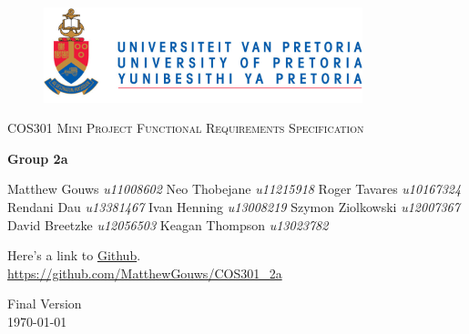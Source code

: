 \begin{titlepage}
	\begin{center}
		
		\begin{figure}[t]
			\centering
			\includegraphics[width=350px]{UP_Logo.png}
		\end{figure}
		
		\textsc{\LARGE COS301 Mini Project Functional \newline\newline Requirements Specification}
		
		\textbf{\newline Group 2a} \\
		\begin{flushright} \large
			Matthew Gouws \emph{u11008602} \newline
			Neo Thobejane \emph{u11215918} \newline
			Roger Tavares \emph{u10167324} \newline
			Rendani Dau \emph{u13381467} \newline
			Ivan Henning \emph{u13008219} \newline
			Szymon Ziolkowski \emph{u12007367} \newline
			David Breetzke  \emph{u12056503} \newline
			Keagan Thompson \emph{u13023782} \newline
		\end{flushright}
		
		\vfill
		
	Here's a link to \href{https://github.com/MatthewGouws/COS301_2a}{Github}.\\
	\url{https://github.com/MatthewGouws/COS301_2a}

	\vfill

	{\large Final Version}
	\\
	{\large \today}		
		
		
	\end{center}
\end{titlepage}
